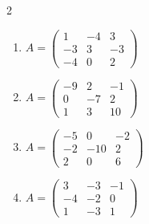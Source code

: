 \begin{multicols}{2}
\begin{enumerate}[label=\arabic*., leftmargin=*]
\item $A=\begin{pmatrix}1 & -4 & 3\\ -3 & 3 & -3\\ -4 & 0 & 2\end{pmatrix}$
\item $A=\begin{pmatrix}-9 & 2 & -1\\ 0 & -7 & 2\\ 1 & 3 & 10\end{pmatrix}$
\item $A=\begin{pmatrix}-5 & 0 & -2\\ -2 & -10 & 2\\ 2 & 0 & 6\end{pmatrix}$
\item $A=\begin{pmatrix}3 & -3 & -1\\ -4 & -2 & 0\\ 1 & -3 & 1\end{pmatrix}$
\end{enumerate}
\end{multicols}

